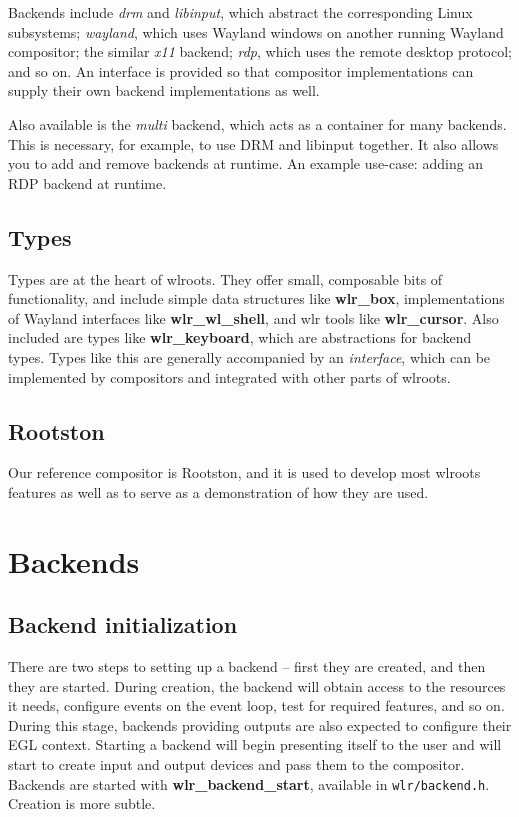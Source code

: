 \documentclass{article}
\newcommand{\code}[1]{\texttt{#1}}
\begin{document}
Backends include \emph{drm} and \emph{libinput}, which abstract the
corresponding Linux subsystems; \emph{wayland}, which uses Wayland windows on
another running Wayland compositor; the similar \emph{x11} backend; \emph{rdp},
which uses the remote desktop protocol; and so on. An interface is provided so
that compositor implementations can supply their own backend implementations as
well.

Also available is the \emph{multi} backend, which acts as a container for many
backends. This is necessary, for example, to use DRM and libinput together. It
also allows you to add and remove backends at runtime. An example use-case:
adding an RDP backend at runtime.

\subsection{Types}\label{high level types}

Types are at the heart of wlroots. They offer small, composable bits of
functionality, and include simple data structures like \textbf{wlr_box},
implementations of Wayland interfaces like \textbf{wlr_wl_shell}, and wlr tools
like \textbf{wlr_cursor}. Also included are types like \textbf{wlr_keyboard},
which are abstractions for backend types. Types like this are generally
accompanied by an \emph{interface}, which can be implemented by compositors and
integrated with other parts of wlroots.

\subsection{Rootston}\label{rootston}

Our reference compositor is Rootston, and it is used to develop most wlroots
features as well as to serve as a demonstration of how they are used.

\newpage
\section{Backends}\label{backends}

\subsection{Backend initialization}\label{backend init}

There are two steps to setting up a backend -- first they are created, and then
they are started. During creation, the backend will obtain access to the
resources it needs, configure events on the event loop, test for required
features, and so on. During this stage, backends providing outputs are also
expected to configure their EGL context. Starting a backend will begin
presenting itself to the user and will start to create input and output devices
and pass them to the compositor. Backends are started with
\textbf{wlr_backend_start}, available in \code{wlr/backend.h}. Creation is more
subtle.
\end{document}
